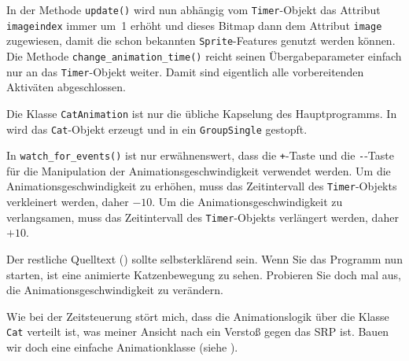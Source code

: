 In der Methode \texttt{update()} wird nun abhängig vom \texttt{Timer}-Objekt das Attribut \texttt{imageindex} immer um~1 erhöht und dieses Bitmap dann dem Attribut \texttt{image} zugewiesen, damit die schon bekannten \texttt{Sprite}-Features genutzt werden können. Die Methode \texttt{change\_\-ani\-ma\-tion\_\-time()} reicht seinen Übergabeparameter einfach nur an das \texttt{Timer}-Objekt weiter. Damit sind eigentlich alle vorbereitenden Aktiväten abgeschlossen.


Die Klasse \texttt{CatAnimation} ist nur die übliche Kapselung des Hauptprogramms. In  wird das \texttt{Cat}-Objekt erzeugt und in ein \texttt{GroupSingle} gestopft.


In \texttt{watch\_for\_events()} ist nur erwähnenswert, dass die \texttt{+}-Taste und die \texttt{-}-Taste für die Manipulation der Animationsgeschwindigkeit verwendet werden. Um die Animationsgeschwindigkeit zu erhöhen, muss das Zeitintervall des \texttt{Timer}-Objekts verkleinert werden, daher $-10$. Um die Animationsgeschwindigkeit zu verlangsamen, muss das Zeitintervall des \texttt{Timer}-Objekts verlängert werden, daher $+10$. 


Der restliche Quelltext () sollte selbsterklärend sein. Wenn Sie das Programm nun starten, ist eine animierte Katzenbewegung zu sehen. Probieren Sie doch mal aus, die Animationsgeschwindigkeit zu verändern. 


Wie bei der Zeitsteuerung stört mich, dass die Animationslogik über die Klasse \texttt{Cat} verteilt ist, was meiner Ansicht nach ein Verstoß gegen das SRP ist. Bauen wir doch eine einfache Animationklasse (siehe ).

